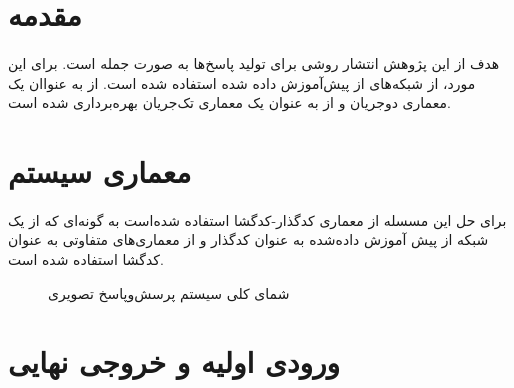 \section{مقدمه}
\paragraph{}{
    هدف از این پژوهش انتشار روشی برای تولید پاسخ‌ها به صورت جمله است. برای این 
    مورد، از شبکه‌های از پیش‌آموزش داده شده استفاده شده است. از 
     \cite{tan-bansal-2019-lxmert}
    به عنواان یک معماری دو‌جریان و از 
     \cite{li-etal-2020-bert-vision}
    به عنوان یک معماری تک‌جریان بهره‌برداری شده است. 
}



\section{
  معماری سیستم
 }
\paragraph{}{
    برای حل این مسسله از معماری کدگذار-کدگشا استفاده شده‌است به گونه‌ای 
    که از یک شبکه از پیش آموزش داده‌شده به عنوان کدگذار و از معماری‌های متفاوتی 
    به عنوان کدگشا استفاده شده است. 
    
}




\begin{figure}[H]
    \caption{شمای کلی سیستم پرسش‌و‌پاسخ تصویری}
    \label{fig:overview}
\end{figure}

\newpage

\section{
  ورودی اولیه و خروجی نهایی
 }

